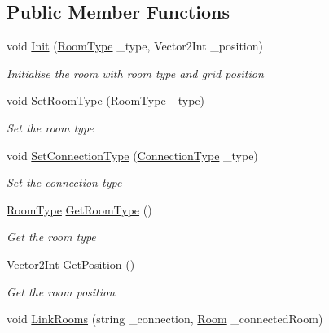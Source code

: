 \subsection*{Public Member Functions}
\begin{DoxyCompactItemize}
\item 
void \mbox{\hyperlink{class_level_generation_1_1_room_ac54baebea1ec085f79843e5c42a66467}{Init}} (\mbox{\hyperlink{namespace_level_generation_a206451e0c8bfced86ae4b9348cd3718f}{Room\+Type}} \+\_\+type, Vector2\+Int \+\_\+position)
\begin{DoxyCompactList}\small\item\em Initialise the room with room type and grid position \end{DoxyCompactList}\item 
void \mbox{\hyperlink{class_level_generation_1_1_room_ac4d1b1b285ac602653b1810eb09492fd}{Set\+Room\+Type}} (\mbox{\hyperlink{namespace_level_generation_a206451e0c8bfced86ae4b9348cd3718f}{Room\+Type}} \+\_\+type)
\begin{DoxyCompactList}\small\item\em Set the room type \end{DoxyCompactList}\item 
void \mbox{\hyperlink{class_level_generation_1_1_room_ae07be6a48b5fa0b1eff3b2ed08be2206}{Set\+Connection\+Type}} (\mbox{\hyperlink{namespace_level_generation_ac48934e101078b19dce3479d82f689e0}{Connection\+Type}} \+\_\+type)
\begin{DoxyCompactList}\small\item\em Set the connection type \end{DoxyCompactList}\item 
\mbox{\hyperlink{namespace_level_generation_a206451e0c8bfced86ae4b9348cd3718f}{Room\+Type}} \mbox{\hyperlink{class_level_generation_1_1_room_aff17f63f58338e84997627bcaed08afc}{Get\+Room\+Type}} ()
\begin{DoxyCompactList}\small\item\em Get the room type \end{DoxyCompactList}\item 
Vector2\+Int \mbox{\hyperlink{class_level_generation_1_1_room_abfd82aaf18d4332f843635b9790af3d7}{Get\+Position}} ()
\begin{DoxyCompactList}\small\item\em Get the room position \end{DoxyCompactList}\item 
void \mbox{\hyperlink{class_level_generation_1_1_room_ae6cd86347ce784fab849c28cf4a70be9}{Link\+Rooms}} (string \+\_\+connection, \mbox{\hyperlink{class_level_generation_1_1_room}{Room}} \+\_\+connected\+Room)

\end{DoxyCompactItemize}
